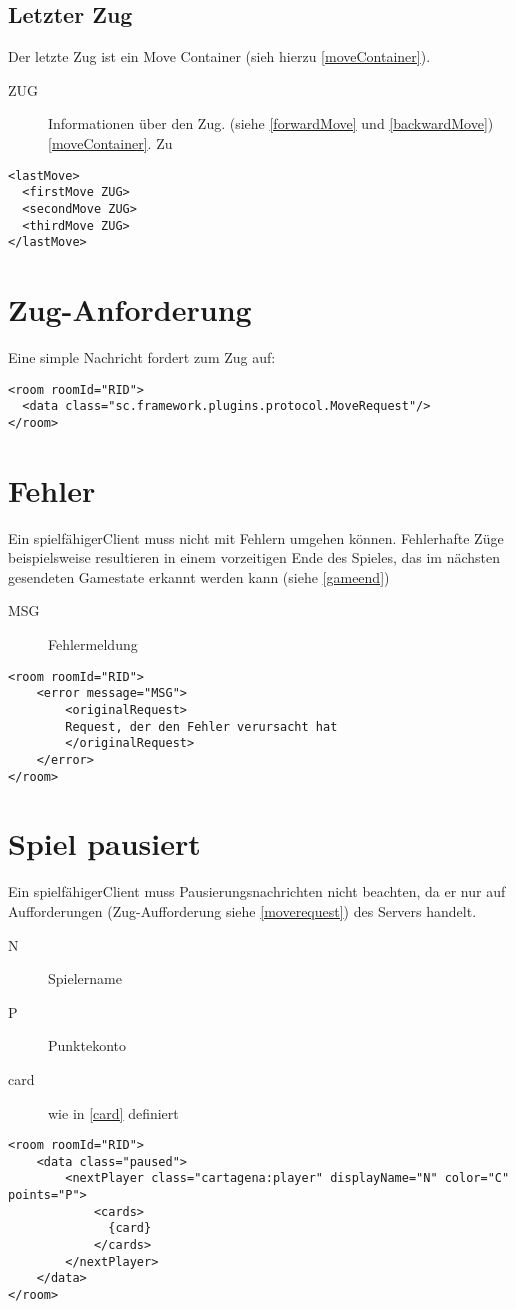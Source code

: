 \documentclass[12pt,a4paper, ngerman, oneside]{scrartcl}
\begin{document}
\subsection{\label{lastmove}Letzter Zug}
Der letzte Zug ist ein Move Container (sieh hierzu \ref{moveContainer}).
\begin{description}
\item[ZUG] Informationen über den Zug. (siehe \ref{forwardMove} und
\ref{backwardMove}) \ref{moveContainer}. Zu 
\end{description}
\begin{verbatim}
<lastMove>
  <firstMove ZUG>
  <secondMove ZUG>
  <thirdMove ZUG>
</lastMove>
\end{verbatim}

\section{\label{moverequest}Zug-Anforderung}
Eine simple Nachricht fordert zum Zug auf:
\begin{verbatim}
<room roomId="RID">
  <data class="sc.framework.plugins.protocol.MoveRequest"/>
</room>
\end{verbatim}

\section{Fehler}
Ein \glqq spielfähiger\grqq Client muss nicht mit Fehlern umgehen können. Fehlerhafte Züge beispielsweise resultieren in einem vorzeitigen Ende des Spieles, das im nächsten gesendeten Gamestate erkannt werden kann (siehe \ref{gameend})
\begin{description}
\item[MSG] Fehlermeldung
\end{description}
\begin{verbatim}
<room roomId="RID">
	<error message="MSG">
		<originalRequest>
		Request, der den Fehler verursacht hat
		</originalRequest>
	</error>
</room>
\end{verbatim}

\section{Spiel pausiert}
Ein \glqq spielfähiger\grqq Client muss Pausierungsnachrichten nicht beachten, da er nur auf Aufforderungen (Zug-Aufforderung siehe \ref{moverequest}) des Servers handelt.
\begin{description}
\item[N] Spielername
\item[P] Punktekonto
\item[card] wie in \ref{card} definiert
\end{description}
\begin{verbatim}
<room roomId="RID">
	<data class="paused">
		<nextPlayer class="cartagena:player" displayName="N" color="C" points="P">
			<cards>
			  {card}
			</cards>
		</nextPlayer>
	</data>
</room>
\end{verbatim}
\end{document}
